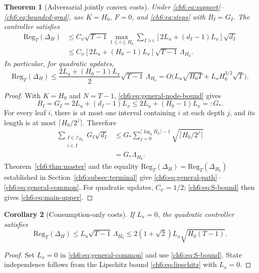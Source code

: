 \documentclass[11pt]{article}
\newcommand{\Reg}{\mathrm{Reg}}
\theoremstyle{plain}
\newtheorem{Thm:Theorem}{Theorem}[section]
\newtheorem{Thm:Corollary}[Thm:Theorem]{Corollary}
\theoremstyle{remark}
\numberwithin{equation}{section}
\begin{document}
\begin{Thm:Theorem}[Adversarial jointly convex costs]\label{ch6:thm:general}
Under \eqref{ch6:eq:support}--\eqref{ch6:eq:bounded-grad}, use $K=H_0$, $F=0$,
and \eqref{ch6:eq:steps} with $B_I=G_I$. The controller satisfies
\begin{align}
 \Reg_T(\Delta_H)
 &\le{C_\psi}\sqrt{T-1}
 \max_{1\le i\le H_0}\sum_{I\ni i}
 [2L_u+(d_I-1)L_x]\sqrt{d_I}\label{ch6:eq:general-path}\\
 &\le{C_\psi}[2L_u+(H_0-1)L_x]\sqrt{T-1}\,\Lambda_{H_0}.
 \label{ch6:eq:general-common}
\end{align}
In particular, for quadratic updates,
\begin{equation}\label{ch6:eq:main-upper}
 \boxed{\Reg_T(\Delta_H)\le
 \frac{2L_u+(H_0-1)L_x}{2}\sqrt{T-1}\,\Lambda_{H_0}
 =O\bigl(L_u\sqrt{H_0T}+L_xH_0^{3/2}\sqrt T\bigr).}
\end{equation}
\end{Thm:Theorem}
\begin{proof}
With $K=H_0$ and $N=T-1$, \eqref{ch6:eq:general-node-bound} gives
\[
B_I=G_I=2L_u+(d_I-1)L_x
\le 2L_u+(H_0-1)L_x=:G_*.
\]
For every leaf $i$, there is at most one interval containing $i$ at each
depth $j$, and its length is at most $\lceil H_0/2^j\rceil$.  Therefore
\begin{align*}
\sum_{\substack{I\in\mathcal I_{H_0}\\i\in I}}
G_I\sqrt{d_I}
&\le G_*\sum_{j=0}^{\lceil\log_2H_0\rceil-1}
\sqrt{\lceil H_0/2^j\rceil}\\
&=G_*\Lambda_{H_0}.
\end{align*}
Theorem~\ref{ch6:thm:master} and the equality
$\Reg_T(\Delta_H)=\Reg_T(\Delta_{H_0})$ established in
Section~\ref{ch6:subsec:terminal} give
\eqref{ch6:eq:general-path}--\eqref{ch6:eq:general-common}.
For quadratic updates, $C_\psi=1/2$; \eqref{ch6:eq:S-bound} then gives
\eqref{ch6:eq:main-upper}.
\end{proof}

\begin{Thm:Corollary}[Consumption-only costs]\label{ch6:cor:action}
If $L_x=0$, the quadratic controller satisfies
\begin{equation}\label{ch6:eq:action-upper}
 \Reg_T(\Delta_H)\le L_u\sqrt{T-1}\,\Lambda_{H_0}
 \le2(1+\sqrt2)L_u\sqrt{H_0(T-1)}.
\end{equation}
\end{Thm:Corollary}
\begin{proof}
Set $L_x=0$ in \eqref{ch6:eq:general-common} and use
\eqref{ch6:eq:S-bound}. State independence follows from the Lipschitz bound
\eqref{ch6:eq:lipschitz} with $L_x=0$.
\end{proof}
\end{document}
